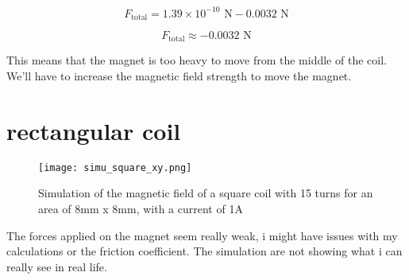 \[
	F_{\text{total}} = 1.39 \times 10^{-10} \text{ N} - 0.0032 \text{ N}
\]

\[
	F_{\text{total}} \approx -0.0032 \text{ N}
\]

This means that the magnet is too heavy to move from the middle of the coil. We'll have to increase the magnetic field strength to move the magnet.


\section{rectangular coil}


\begin{figure}[H]
	\centering
	\texttt{[image: simu\_square\_xy.png]}
	\caption[Simulation of the magnetic field of a square coil]{Simulation of the magnetic field of a square coil with 15 turns for an area of 8mm x 8mm, with a current of 1A}
	\label{fig:simu_square}
\end{figure}

The forces applied on the magnet seem really weak, i might have issues with my calculations or the friction coefficient. The simulation are not showing what i can really see in real life.